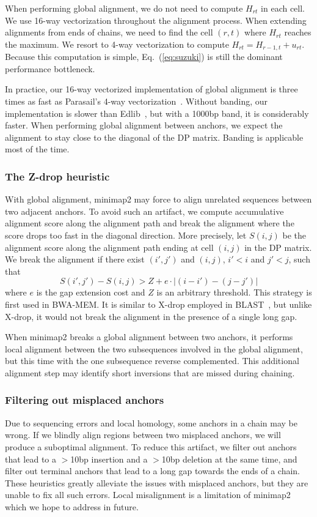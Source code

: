 \documentclass{bioinfo}
\begin{document}
\begin{methods}
When performing global alignment, we do not need to compute $H_{rt}$ in each cell.
We use 16-way vectorization throughout the alignment process. When extending
alignments from ends of chains, we need to find the cell $(r,t)$ where $H_{rt}$
reaches the maximum. We resort to 4-way vectorization to compute
$H_{rt}=H_{r-1,t}+u_{rt}$. Because this computation is simple,
Eq.~(\ref{eq:suzuki}) is still the dominant performance bottleneck.

In practice, our 16-way vectorized implementation of global alignment is three
times as fast as Parasail's 4-way vectorization~\citep{Daily:2016aa}.  Without
banding, our implementation is slower than Edlib~\citep{Sosic:2017aa}, but with
a 1000bp band, it is considerably faster. When performing global alignment
between anchors, we expect the alignment to stay close to the diagonal of the
DP matrix. Banding is applicable most of the time.

\subsubsection{The Z-drop heuristic}

With global alignment, minimap2 may force to align unrelated sequences between
two adjacent anchors. To avoid such an artifact, we compute accumulative
alignment score along the alignment path and break the alignment where the
score drops too fast in the diagonal direction. More precisely, let $S(i,j)$ be
the alignment score along the alignment path ending at cell $(i,j)$ in the DP
matrix. We break the alignment if there exist $(i',j')$ and $(i,j)$, $i'<i$ and
$j'<j$, such that
\[
S(i',j')-S(i,j)>Z+e\cdot|(i-i')-(j-j')|
\]
where $e$ is the gap extension cost and $Z$ is an arbitrary threshold.
This strategy is first used in BWA-MEM. It is similar to X-drop employed in
BLAST~\citep{Altschul:1997vn}, but unlike X-drop, it would not break the
alignment in the presence of a single long gap.

When minimap2 breaks a global alignment between two anchors, it performs local
alignment between the two subsequences involved in the global alignment, but
this time with the one subsequence reverse complemented. This additional
alignment step may identify short inversions that are missed during chaining.

\subsubsection{Filtering out misplaced anchors}
Due to sequencing errors and local homology, some anchors in a chain may be
wrong. If we blindly align regions between two misplaced anchors, we will
produce a suboptimal alignment. To reduce this artifact, we filter out
anchors that lead to a $>$10bp insertion and a $>$10bp deletion at the same
time, and filter out terminal anchors that lead to a long gap towards the ends
of a chain. These heuristics greatly alleviate the issues with misplaced
anchors, but they are unable to fix all such errors. Local misalignment is a
limitation of minimap2 which we hope to address in future.


\end{methods}
\end{document}
